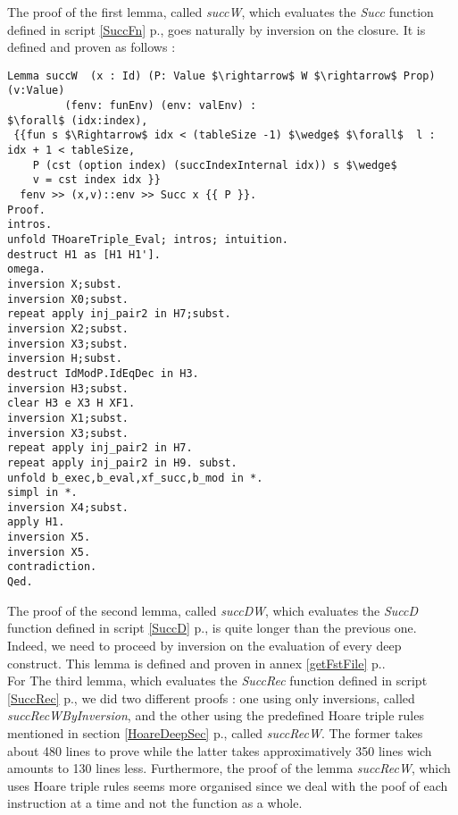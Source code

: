 The proof of the first lemma, called \textit{succW}, which evaluates the \textit{Succ} function defined in script \ref{SuccFn} p.\pageref{SuccFn}, goes naturally by inversion on the closure. It is defined and proven as follows :
\begin{lstlisting}[caption = {succW Lemma definition and proof}, xleftmargin=-.05\textwidth,
xrightmargin=-.05\textwidth,mathescape=true]
Lemma succW  (x : Id) (P: Value $\rightarrow$ W $\rightarrow$ Prop) (v:Value) 
	     (fenv: funEnv) (env: valEnv) :
$\forall$ (idx:index),
 {{fun s $\Rightarrow$ idx < (tableSize -1) $\wedge$ $\forall$  l : idx + 1 < tableSize, 
    P (cst (option index) (succIndexInternal idx)) s $\wedge$
    v = cst index idx }}  
  fenv >> (x,v)::env >> Succ x {{ P }}.
Proof.
intros.
unfold THoareTriple_Eval; intros; intuition.
destruct H1 as [H1 H1'].
omega.
inversion X;subst.
inversion X0;subst.
repeat apply inj_pair2 in H7;subst.
inversion X2;subst.
inversion X3;subst.
inversion H;subst.
destruct IdModP.IdEqDec in H3.
inversion H3;subst.
clear H3 e X3 H XF1.
inversion X1;subst.
inversion X3;subst.
repeat apply inj_pair2 in H7.
repeat apply inj_pair2 in H9. subst.
unfold b_exec,b_eval,xf_succ,b_mod in *.
simpl in *.
inversion X4;subst.
apply H1.
inversion X5.
inversion X5.
contradiction.
Qed.
\end{lstlisting} \vspace{4pt}

The proof of the second lemma, called \textit{succDW}, which evaluates the \textit{SuccD} function defined in script \ref{SuccD} p.\pageref{SuccD}, is quite longer than the previous one. Indeed, we need to proceed by inversion on the evaluation of every deep construct. This lemma is defined and proven in annex \ref{getFstFile} p.\pageref{getFstFile}.  \\  

For The third lemma, which evaluates the \textit{SuccRec} function defined in script \ref{SuccRec} p.\pageref{SuccRec}, we did two different proofs : one using only inversions, called \textit{succRecWByInversion}, and the other using the predefined Hoare triple rules mentioned in section \ref{HoareDeepSec} p.\pageref{HoareDeepSec}, called \textit{succRecW}. The former takes about 480 lines to prove while the latter takes approximatively 350 lines wich amounts to 130 lines less. Furthermore, the proof of the lemma \textit{succRecW}, which uses Hoare triple rules seems more organised since we deal with the poof of each instruction at a time and not the function as a whole.\\

